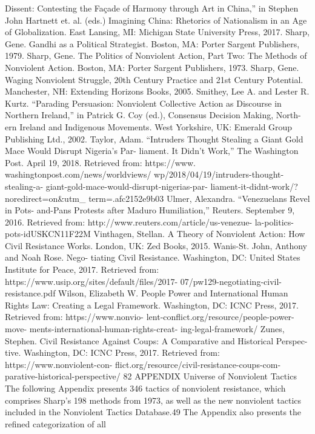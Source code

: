 \documentclass[twoside,a4paper,12pt,fleqn,openany]{extbook}
\begin{document}
Dissent: Contesting the Façade of Harmony
through Art in China,” in Stephen John Hartnett
et. al. (eds.) Imagining China: Rhetorics
of Nationalism in an Age of Globalization.
East Lansing, MI: Michigan State University
Press, 2017.
Sharp, Gene. Gandhi as a Political Strategist.
Boston, MA: Porter Sargent Publishers, 1979.
Sharp, Gene. The Politics of Nonviolent Action,
Part Two: The Methods of Nonviolent Action.
Boston, MA: Porter Sargent Publishers, 1973.
Sharp, Gene. Waging Nonviolent Struggle,
20th Century Practice and 21st Century Potential.
Manchester, NH: Extending Horizons Books,
2005.
Smithey, Lee A. and Lester R. Kurtz. “Parading
Persuasion: Nonviolent Collective Action as
Discourse in Northern Ireland,” in Patrick G.
Coy (ed.), Consensus Decision Making, North-
ern Ireland and Indigenous Movements. West
Yorkshire, UK: Emerald Group Publishing
Ltd., 2002.
Taylor, Adam. “Intruders Thought Stealing a
Giant Gold Mace Would Disrupt Nigeria’s Par-
liament. It Didn’t Work,” The Washington Post.
April 19, 2018. Retrieved from: https://www.
washingtonpost.com/news/worldviews/
wp/2018/04/19/intruders-thought-stealing-a-
giant-gold-mace-would-disrupt-nigerias-par-
liament-it-didnt-work/?noredirect=on&utm_
term=.afc2152e9b03
Ulmer, Alexandra. “Venezuelans Revel in Pots-
and-Pans Protests after Maduro Humiliation,”
Reuters. September 9, 2016. Retrieved from:
http://www.reuters.com/article/us-venezue-
la-politics-pots-idUSKCN11F22M
Vinthagen, Stellan. A Theory of Nonviolent
Action: How Civil Resistance Works. London,
UK: Zed Books, 2015.
Wanis-St. John, Anthony and Noah Rose. Nego-
tiating Civil Resistance. Washington, DC: United
States Institute for Peace, 2017. Retrieved from:
https://www.usip.org/sites/default/files/2017-
07/pw129-negotiating-civil-resistance.pdf
Wilson, Elizabeth W. People Power and
International Human Rights Law: Creating a
Legal Framework. Washington, DC: ICNC Press,
2017. Retrieved from: https://www.nonvio-
lent-conflict.org/resource/people-power-move-
ments-international-human-rights-creat-
ing-legal-framework/
Zunes, Stephen. Civil Resistance Against
Coups: A Comparative and Historical Perspec-
tive. Washington, DC: ICNC Press, 2017.
Retrieved from: https://www.nonviolent-con-
flict.org/resource/civil-resistance-coups-com-
parative-historical-perspective/
82
APPENDIX
Universe of Nonviolent Tactics
The following Appendix presents 346 tactics of nonviolent resistance, which comprises
Sharp’s 198 methods from 1973, as well as the new nonviolent tactics included in the
Nonviolent Tactics Database.49 The Appendix also presents the refined categorization of all
\end{document}
